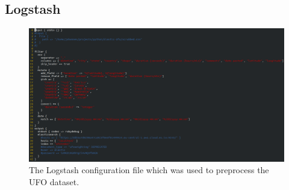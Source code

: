 \documentclass[bibliography=totoc]{article}
\begin{document}
\subsection{Logstash}
\begin{figure}
\includegraphics[height=0.5\textwidth]{logstash_config.png}
\caption{\label{logstash_config_file}
The Logstash configuration file which was used to preprocess the UFO dataset.}
\end{figure}
\end{document}
